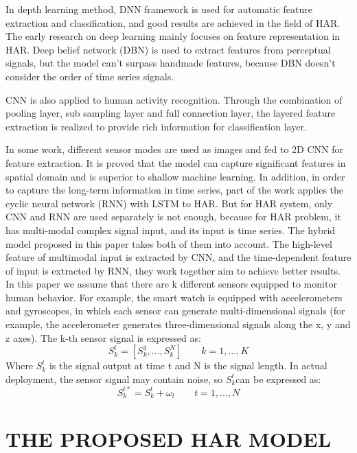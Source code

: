 \documentclass{article}
\begin{document}
In depth learning method, DNN framework is used for automatic feature extraction and classification, and good results are achieved in the field of HAR. The early research on deep learning mainly focuses on feature representation in HAR. Deep belief network (DBN) is used to extract features from perceptual signals, but the model can't surpass handmade features, because DBN doesn't consider the order of time series signals.

CNN is also applied to human activity recognition. Through the combination of pooling layer, sub sampling layer and full connection layer, the layered feature extraction is realized to provide rich information for classification layer.

In some work, different sensor modes are used as images
and fed to 2D CNN for feature extraction. It is proved that
the model can capture significant features in spatial domain
and is superior to shallow machine learning. In addition, in
order to capture the long-term information in time series,
part of the work applies the cyclic neural network (RNN)
with LSTM to HAR.
But for HAR system, only CNN and RNN are used
separately is not enough, because for HAR problem, it has
multi-modal complex signal input, and its input is time series.
The hybrid model proposed in this paper takes both of them
into account. The high-level feature of multimodal input is
extracted by CNN, and the time-dependent feature of input is
extracted by RNN, they work together aim to achieve better
results.
In this paper we assume that there are k different sensors
equipped to monitor human behavior. For example, the
smart watch is equipped with accelerometers and gyroscopes,
in which each sensor can generate multi-dimensional signals
(for example, the accelerometer generates three-dimensional
signals along the x, y and z axes). The k-th sensor signal is
expressed as:
\begin{equation}
     S_{k}^{t}=[S_{k}^{1},...,S_{k}^{N}] \qquad k=1,...,K \label{1}
\end{equation}
Where $S_{k}^t$ is the signal output at time t and N is the signal
length. In actual deployment, the sensor signal may contain
noise, so $S_{k}^t$can be expressed as:
\begin{equation}
    S_{k}^{t*}=S_{k}^{t}+\omega_{t}\qquad t=1,...,N  \label{2}
\end{equation}
\section{THE PROPOSED HAR MODEL}
\end{document}
